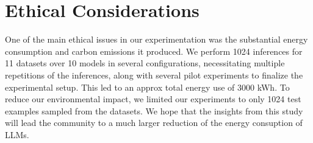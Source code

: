 
\section*{Ethical Considerations}
One of the main ethical issues in our experimentation was the substantial energy consumption and carbon emissions it produced. We perform 1024 inferences for 11 datasets over 10 models in several configurations, necessitating multiple repetitions of the inferences, along with several pilot experiments to finalize the experimental setup. This led to an approx total energy use of $3000$ kWh. To reduce our environmental impact, we limited our experiments to only 1024 test examples sampled from the datasets. 
We hope that the insights from this study will lead the community to a much larger reduction of the energy consuption of LLMs.

